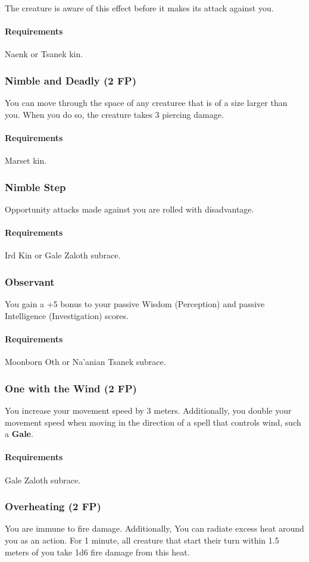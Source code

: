     The creature is aware of this effect before it makes its attack against you.
    \paragraph{Requirements} Naenk or Tsanek kin.
\subsubsection{Nimble and Deadly (2 FP)} \label{feat::nimbleanddeadly}
    You can move through the space of any creaturee that is of a size larger than you.
    When you do so, the creature takes 3 piercing damage.
    \paragraph{Requirements} Marset kin.
\subsubsection{Nimble Step} \label{feat::nimblestep}
    Opportunity attacks made against you are rolled with disadvantage.
    \paragraph{Requirements} Ird Kin or Gale Zaloth subrace.
\subsubsection{Observant} \label{feat::observant}
    You gain a +5 bonus to your passive Wisdom (Perception) and passive Intelligence (Investigation) scores.
    \paragraph{Requirements} Moonborn Oth or Na'anian Tsanek subrace.
\subsubsection{One with the Wind (2 FP)} \label{feat::onewiththewind}
    You increase your movement speed by 3 meters.
    Additionally, you double your movement speed when moving in the direction of a spell that controls wind, such a \textbf{Gale}.
    \paragraph{Requirements} Gale Zaloth subrace.
\subsubsection{Overheating (2 FP)} \label{feat::overheating}
    You are immune to fire damage.
    Additionally, You can radiate excess heat around you as an action.
    For 1 minute, all creature that start their turn within 1.5 meters of you take 1d6 fire damage from this heat.

